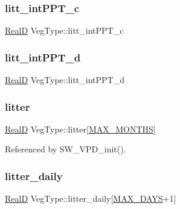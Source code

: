 \subsubsection{\texorpdfstring{litt\+\_\+int\+P\+P\+T\+\_\+c}{litt\_intPPT\_c}}
{\footnotesize\ttfamily \hyperlink{generic_8h_af1c105fd5732f70b91ddaeda0cc340e3}{RealD} Veg\+Type\+::litt\+\_\+int\+P\+P\+T\+\_\+c}

\mbox{\label{struct_veg_type_a7b43bc786d7b25661a4a99e55f96bd9d}} 
\subsubsection{\texorpdfstring{litt\+\_\+int\+P\+P\+T\+\_\+d}{litt\_intPPT\_d}}
{\footnotesize\ttfamily \hyperlink{generic_8h_af1c105fd5732f70b91ddaeda0cc340e3}{RealD} Veg\+Type\+::litt\+\_\+int\+P\+P\+T\+\_\+d}

\mbox{\label{struct_veg_type_a88a2f9babc0cc68dbe22df58f193ccab}} 
\subsubsection{\texorpdfstring{litter}{litter}}
{\footnotesize\ttfamily \hyperlink{generic_8h_af1c105fd5732f70b91ddaeda0cc340e3}{RealD} Veg\+Type\+::litter\mbox{[}\hyperlink{_times_8h_a9c97e6841188b672e984a4eba7479277}{M\+A\+X\+\_\+\+M\+O\+N\+T\+HS}\mbox{]}}



Referenced by S\+W\+\_\+\+V\+P\+D\+\_\+init().

\mbox{\label{struct_veg_type_a00218e0ea1cfc50562ffd87f8b16e834}} 
\subsubsection{\texorpdfstring{litter\+\_\+daily}{litter\_daily}}
{\footnotesize\ttfamily \hyperlink{generic_8h_af1c105fd5732f70b91ddaeda0cc340e3}{RealD} Veg\+Type\+::litter\+\_\+daily\mbox{[}\hyperlink{_times_8h_a01f08d46080872b9f4284873b7f9dee4}{M\+A\+X\+\_\+\+D\+A\+YS}+1\mbox{]}}



